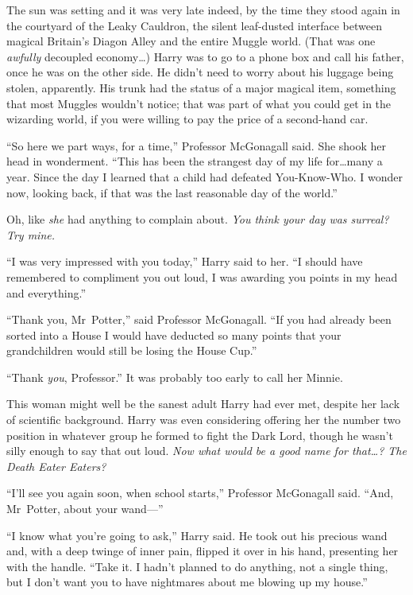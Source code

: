 \later

The sun was setting and it was very late indeed, by the time they stood again in the courtyard of the Leaky Cauldron, the silent leaf-dusted interface between magical Britain’s Diagon Alley and the entire Muggle world. (That was one \emph{awfully} decoupled economy…) Harry was to go to a phone box and call his father, once he was on the other side. He didn’t need to worry about his luggage being stolen, apparently. His trunk had the status of a major magical item, something that most Muggles wouldn’t notice; that was part of what you could get in the wizarding world, if you were willing to pay the price of a second-hand car.

“So here we part ways, for a time,” Professor McGonagall said. She shook her head in wonderment. “This has been the strangest day of my life for…many a year. Since the day I learned that a child had defeated You-Know-Who. I wonder now, looking back, if that was the last reasonable day of the world.”

Oh, like \emph{she} had anything to complain about. \emph{You think your day was surreal? Try mine.}

“I was very impressed with you today,” Harry said to her. “I should have remembered to compliment you out loud, I was awarding you points in my head and everything.”

“Thank you, Mr~Potter,” said Professor McGonagall. “If you had already been sorted into a House I would have deducted so many points that your grandchildren would still be losing the House Cup.”

“Thank \emph{you}, Professor.” It was probably too early to call her Minnie.

This woman might well be the sanest adult Harry had ever met, despite her lack of scientific background. Harry was even considering offering her the number two position in whatever group he formed to fight the Dark Lord, though he wasn’t silly enough to say that out loud. \emph{Now what would be a good name for that…? The Death Eater Eaters?}

“I’ll see you again soon, when school starts,” Professor McGonagall said. “And, Mr~Potter, about your wand—”

“I know what you’re going to ask,” Harry said. He took out his precious wand and, with a deep twinge of inner pain, flipped it over in his hand, presenting her with the handle. “Take it. I hadn’t planned to do anything, not a single thing, but I don’t want you to have nightmares about me blowing up my house.”

